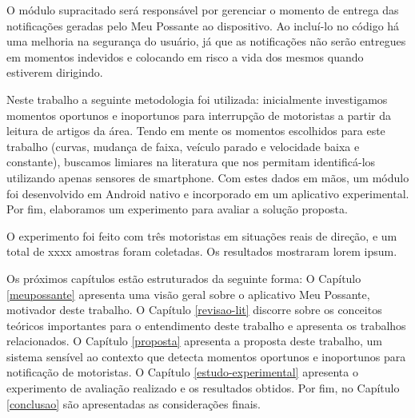 O módulo supracitado será responsável por gerenciar o momento de entrega das notificações geradas pelo Meu Possante ao dispositivo. Ao
incluí-lo no código há uma melhoria na segurança do usuário, já que as notificações não serão entregues em momentos indevidos e
colocando em risco a vida dos mesmos quando estiverem dirigindo.

Neste trabalho a seguinte metodologia foi utilizada: inicialmente investigamos momentos oportunos e inoportunos para interrupção de motoristas
a partir da leitura de artigos da área. Tendo em mente os momentos escolhidos para este trabalho (curvas, mudança de faixa, veículo parado e
velocidade baixa e constante), buscamos limiares na literatura que nos permitam identificá-los utilizando apenas sensores de smartphone.
Com estes dados em mãos, um módulo foi desenvolvido em Android nativo e incorporado em um aplicativo experimental. Por fim, elaboramos um
experimento para avaliar a solução proposta.

O experimento foi feito com três motoristas em situações reais de direção, e um total de xxxx amostras foram coletadas. Os resultados mostraram
lorem ipsum.

Os próximos capítulos estão estruturados da seguinte forma: O Capítulo \ref{meupossante} apresenta uma visão geral sobre o aplicativo Meu Possante,
motivador deste trabalho. O Capítulo \ref{revisao-lit} discorre sobre os conceitos teóricos importantes para o entendimento deste trabalho e
apresenta os trabalhos relacionados. O Capítulo \ref{proposta} apresenta a proposta deste trabalho, um sistema sensível ao contexto que detecta
momentos oportunos e inoportunos para notificação de motoristas. O Capítulo \ref{estudo-experimental} apresenta o experimento de avaliação realizado e
os resultados obtidos. Por fim, no Capítulo \ref{conclusao} são apresentadas as considerações finais.
